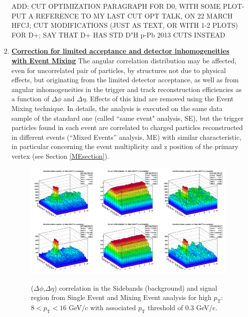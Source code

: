 \begin{enumerate}
ADD: CUT OPTIMIZATION PARAGRAPH FOR D0, WITH SOME PLOT- PUT A REFERENCE TO MY LAST CUT OPT TALK, ON 22 MARCH HFCJ; CUT MODIFICATIONS (JUST AS TEXT, OR WITH 1-2 PLOTS) FOR D+; SAY THAT D+ HAS STD D"H p-Pb 2013 CUTS INSTEAD

\item
\underline {\bf Correction for limited acceptance and detector inhomogeneities with Event Mixing}
The angular correlation distribution may be affected, even for uncorrelated pair of particles, by structures not due to physical effects, but originating from the limited detector acceptance, as well as from angular inhomogeneities in the trigger and track reconstruction efficiencies as a function of $\Delta\phi$ and $\Delta\eta$.
Effects of this kind are removed using the Event Mixing technique.
In details, the analysis is executed on the same data sample of the standard one (called ``same event" analysis, SE), but the trigger particles found in each event are correlated to charged particles reconstructed in different events (``Mixed Events'' analysis, ME) with similar characteristic, in particular concerning the event multiplicity and z position of the primary vertex (see Section \ref{MEsection}). \\

\begin{figure}
\centering
{\includegraphics[width=1\linewidth]{figures/Dzero/CorrSEandME_Dzero_Canvas_PtIntBins9to11_pool7_thr0dot3to99dot0.png}}

 \caption{ ($\Delta\phi$,$ \Delta\eta$) correlation in the Sidebands (background) and signal region from  Single Event and Mixing Event analysis for high $p_\mathrm{T}$: $8 < p_\mathrm{T}<16$ GeV/c with associated $p_\mathrm{T}$ threshold of 0.3 GeV/c.}

\label{fig:DzeroME}
\end{figure}


\end{enumerate}
